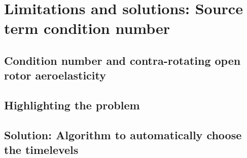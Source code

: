 
\chapter{Limitations and solutions: Source term condition number}
\label{cha:limitations_condition_number}

\chabstract{}

\minitoc
\newpage

\section{Condition number and contra-rotating open rotor aeroelasticity}
\label{sec:condition_cror_ael}


\section{Highlighting the problem}
\label{sec:condition_pbm}


\section{Solution: Algorithm to automatically choose the timelevels} %
\label{sec:condition_solution}


\chconclu{}
